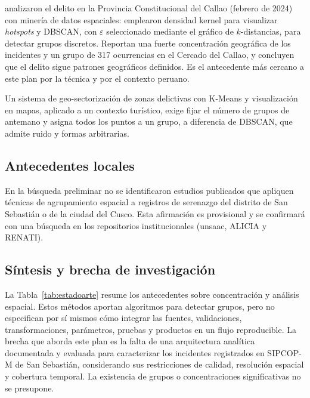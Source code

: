 \citet{cutid2025} analizaron el delito en la Provincia Constitucional del Callao (febrero de 2024) con minería de datos espaciales: emplearon densidad kernel para visualizar \textit{hotspots} y DBSCAN, con $\varepsilon$ seleccionado mediante el gráfico de $k$-distancias, para detectar grupos discretos. Reportan una fuerte concentración geográfica de los incidentes y un grupo de 317 ocurrencias en el Cercado del Callao, y concluyen que el delito sigue patrones geográficos definidos. Es el antecedente más cercano a este plan por la técnica y por el contexto peruano.

Un sistema de geo-sectorización de zonas delictivas con K-Means y visualización en mapas, aplicado a un contexto turístico, exige fijar el número de grupos de antemano y asigna todos los puntos a un grupo, a diferencia de DBSCAN, que admite ruido y formas arbitrarias.

\subsection{Antecedentes locales}

En la búsqueda preliminar no se identificaron estudios publicados que apliquen técnicas de agrupamiento espacial a registros de serenazgo del distrito de San Sebastián o de la ciudad del Cusco. Esta afirmación es provisional y se confirmará con una búsqueda en los repositorios institucionales (\gls{unsaac}, ALICIA y RENATI).

\subsection{Síntesis y brecha de investigación}

La Tabla~\ref{tab:estadoarte} resume los antecedentes sobre concentración y análisis espacial. Estos métodos aportan algoritmos para detectar grupos, pero no especifican por sí mismos cómo integrar las fuentes, validaciones, transformaciones, parámetros, pruebas y productos en un flujo reproducible. La brecha que aborda este plan es la falta de una arquitectura analítica documentada y evaluada para caracterizar los incidentes registrados en SIPCOP-M de San Sebastián, considerando sus restricciones de calidad, resolución espacial y cobertura temporal. La existencia de grupos o concentraciones significativas no se presupone.

